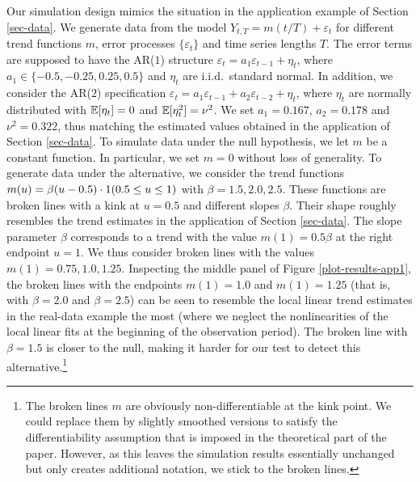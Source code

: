 Our simulation design mimics the situation in the application example of Section \ref{sec-data}. We generate data from the model $Y_{t,T} = m(t/T) + \varepsilon_t$ for different trend functions $m$, error processes $\{\varepsilon_t\}$ and time series lengths $T$. The error terms are supposed to have the AR($1$) structure $\varepsilon_t = a_1 \varepsilon_{t-1} + \eta_t$, where $a_1 \in \{-0.5,-0.25,0.25,0.5\}$ and $\eta_t$ are i.i.d.\ standard normal. In addition, we consider the AR($2$) specification $\varepsilon_t = a_1 \varepsilon_{t-1} + a_2 \varepsilon_{t-2} + \eta_t$, where $\eta_t$ are normally distributed with $\mathbb{E}[\eta_t] = 0$ and $\mathbb{E}[\eta_t^2] = \nu^2$. We set $a_1 = 0.167$, $a_2 = 0.178$ and $\nu^2 = 0.322$, thus matching the estimated values obtained in the application of Section \ref{sec-data}. To simulate data under the null hypothesis, we let $m$ be a constant function. In particular, we set $m = 0$ without loss of generality. To generate data under the alternative, we consider the trend functions $m(u) = \beta (u - 0.5) \cdot 1(0.5 \le u \le 1)$ with $\beta = 1.5,2.0,2.5$. These functions are broken lines with a kink at $u = 0.5$ and different slopes $\beta$. Their shape roughly resembles the trend estimates in the application of Section \ref{sec-data}. The slope parameter $\beta$ corresponds to a trend with the value $m(1) = 0.5 \beta$ at the right endpoint $u = 1$. We thus consider broken lines with the values $m(1) = 0.75, 1.0, 1.25$. Inspecting the middle panel of Figure \ref{plot-results-app1}, the broken lines with the endpoints $m(1) = 1.0$ and $m(1) = 1.25$ (that is, with $\beta = 2.0$ and $\beta = 2.5$) can be seen to resemble the local linear trend estimates in the real-data example the most (where we neglect the nonlinearities of the local linear fits at the beginning of the observation period). The broken line with $\beta = 1.5$ is closer to the null, making it harder for our test to detect this alternative.\footnote{The broken lines $m$ are obviously non-differentiable at the kink point. We could replace them by slightly smoothed versions to satisfy the differentiability assumption that is imposed in the theoretical part of the paper. However, as this leaves the simulation results essentially unchanged but only creates additional notation, we stick to the broken lines.}


